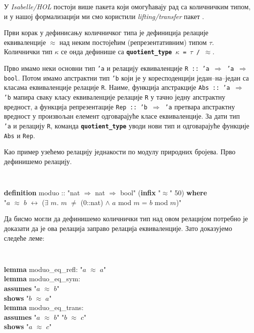 У \emph{Isabelle/HOL} постоји више пакета који омогућавају рад са
количничким типом, и у нашој формализацији ми смо користили
\emph{lifting/transfer} пакет \cite{lifting-transfer}.

Први корак у дефинисању количничког типа је дефиниција релације
еквиваленције $\approx$ над неким постојећим
(ре\-пре\-зе\-нта\-ти\-вним) типом $\tau$. Количнички тип $\kappa$ се
онда дефинише са {\tt \textbf{quotient\_type} $\kappa$ = $\tau$ /
  $\approx$}. 

Прво имамо неки основни тип {\tt 'a} и релацију еквиваленције {\tt R
  :: 'a $\Rightarrow$ 'a $\Rightarrow$ bool}. Потом имамо апстрактни
тип {\tt 'b} који је у коресподенцији један--на--један са класама
еквиваленције релације {\tt R}. Наиме, функција апстракције {\tt Abs
  :: 'a $\Rightarrow$ 'b} мапира сваку класу еквиваленције релације
{\tt R} у тачно једну апстрактну вредност, а функција репрезентације
{\tt Rep :: 'b $\Rightarrow$ 'a} претвара апстрактну вредност у
произвољан елемент одговарајуће класе еквиваленције. За дати тип {\tt
  'a} и релацију {\tt R}, команда {\tt \textbf{quotient\_type}} уводи
нови тип и одговарајуће функције {\tt Abs} и {\tt Rep}.

 Као пример узећемо релацију једнакости по модулу природних
 бројева. Прво дефинишемо релацију.

\smallskip
{}
\begin{small}
{\tt 
\begin{tabbing}
\textbf{def}\=\textbf{inition} moduo :: "nat $\Rightarrow$ nat $\Rightarrow$ bool" (\textbf{infix} "$\approx$" 50) \textbf{where} \\
 \> "$a$ $\approx$ $b$ $\longleftrightarrow$ ($\exists$ $m$. $m$ $\neq$ ($0$::nat) $\land$ $a$ mod $m$ = $b$ mod $m$)"
\end{tabbing}
}
\end{small}

Да бисмо могли да дефинишемо количнички тип над овом релацијом
потребно је доказати да је ова релација заправо релација
еквиваленције. Зато доказујемо следеће леме:

\smallskip
{}
\begin{small}
{\tt 
\begin{tabbing}
\textbf{lem}\=\textbf{ma} moduo\_eq\_refl: "$a$ $\approx$ $a$" \\

\textbf{lemma} moduo\_eq\_sym: \\
  \> \textbf{assumes} "$a$ $\approx$ $b$" \\
  \> \textbf{shows} "$b$ $\approx$ $a$" \\

\textbf{lemma} moduo\_eq\_trans: \\
  \> \textbf{assumes} "$a$ $\approx$ $b$"  "$b$ $\approx$ $c$" \\
  \> \textbf{shows} "$a$ $\approx$ $c$"
\end{tabbing}
}
\end{small}

